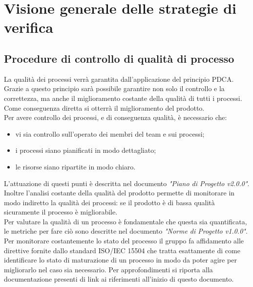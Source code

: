 \documentclass[12pt,a4paper,titlepage]{article}
\begin{document}
	\newpage
	\section{Visione generale delle strategie di verifica}
	\subsection{Procedure di controllo di qualità di processo}
	La qualità dei processi verrà garantita dall'applicazione del principio PDCA. Grazie a questo principio sarà possibile garantire non solo il controllo e la correttezza, ma anche il miglioramento costante della qualità di tutti i processi. Come conseguenza diretta si otterrà il miglioramento del prodotto.\\
	Per avere controllo dei processi, e di conseguenza qualità, è necessario che:
	\begin{itemize}
		\item vi sia controllo sull'operato dei membri del team e sui processi;
		\item i processi siano pianificati in modo dettagliato;
		\item le risorse siano ripartite in modo chiaro.
	\end{itemize}
	L'attuazione di questi punti è descritta nel documento \textit{"Piano di Progetto v2.0.0"}. Inoltre l'analisi costante della qualità del prodotto permette di monitorare in modo indiretto la qualità dei processi: se il prodotto è di bassa qualità sicuramente il processo è migliorabile.\\
	Per valutare la qualità di un processo è fondamentale che questa sia quantificata, le metriche per fare ciò sono descritte nel documento \textit{"Norme di Progetto v1.0.0"}.\\
	
	Per monitorare costantemente lo stato del processo il gruppo fa affidamento alle direttive fornite dallo standard ISO/IEC 15504 che tratta esattamente di come identificare lo stato di maturazione di un processo in modo da poter agire per migliorarlo nel caso sia necessario. Per approfondimenti si riporta alla documentazione presenti di link ai riferimenti all'inizio di questo documento.\\
	
\end{document}
